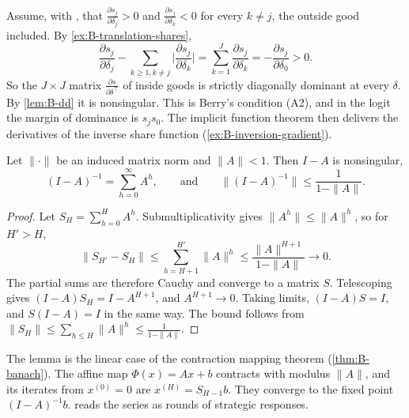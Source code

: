 \begin{example}\label{ex:B-share-dd}
Assume, with \citet[p.~260]{Berry1994}, that $\frac{\partial s_j}{\partial \delta_j} > 0$ and
$\frac{\partial s_j}{\partial \delta_k} < 0$ for every $k \neq j$, the outside good included. By
\cref{ex:B-translation-shares},
\begin{equation*}
\frac{\partial s_j}{\partial \delta_j} - \sum_{k \geq 1, k \neq j}\Big|\frac{\partial s_j}{\partial \delta_k}\Big|
= \sum_{k = 1}^{J}\frac{\partial s_j}{\partial \delta_k} = -\frac{\partial s_j}{\partial \delta_0} > 0 .
\end{equation*}
So the $J \times J$ matrix $\frac{\partial s}{\partial \delta^\top}$ of inside goods is strictly diagonally dominant at every
$\delta$. By \cref{lem:B-dd} it is nonsingular. This is Berry's condition (A2), and in the logit the margin of
dominance is $s_js_0$. The implicit function theorem then delivers the derivatives of the inverse share function
(\cref{ex:B-inversion-gradient}).
\end{example}

\begin{lemma}\label{lem:B-neumann}
Let $\|\cdot\|$ be an induced matrix norm and $\|A\| < 1$. Then $I - A$ is nonsingular,
\begin{equation*}
(I - A)^{-1} = \sum_{h = 0}^{\infty}A^h , \qquad\text{and}\qquad \big\|(I - A)^{-1}\big\| \leq \frac{1}{1 - \|A\|} .
\end{equation*}
\end{lemma}

\begin{proof}
Let $S_H = \sum_{h = 0}^{H}A^h$. Submultiplicativity gives $\|A^h\| \leq \|A\|^h$, so for $H' > H$,
\begin{equation*}
\|S_{H'} - S_H\| \leq \sum_{h = H + 1}^{H'}\|A\|^h \leq \frac{\|A\|^{H + 1}}{1 - \|A\|} \to 0 .
\end{equation*}
The partial sums are therefore Cauchy and converge to a matrix $S$. Telescoping gives
$(I - A)S_H = I - A^{H + 1}$, and $A^{H + 1} \to 0$. Taking limits, $(I - A)S = I$, and $S(I - A) = I$ in the same
way. The bound follows from $\|S_H\| \leq \sum_{h \leq H}\|A\|^h \leq \frac{1}{1 - \|A\|}$.
\end{proof}

The lemma is the linear case of the contraction mapping theorem (\cref{thm:B-banach}). The affine map
$\Phi(x) = Ax + b$ contracts with modulus $\|A\|$, and its iterates from $x^{(0)} = 0$ are $x^{(H)} = S_{H - 1}b$. They
converge to the fixed point $(I - A)^{-1}b$.  reads the series as rounds of strategic responses.

